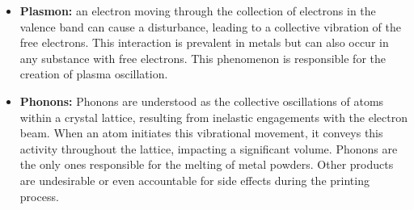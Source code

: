 \begin{itemize}
    \item \textbf{Plasmon:} an electron moving through the collection of electrons in the valence band can cause a disturbance, leading to a collective vibration of the free electrons. This interaction is prevalent in metals but can also occur in any substance with free electrons. This phenomenon is responsible for the creation of plasma oscillation.
    \item \textbf{Phonons:} Phonons are understood as the collective oscillations of atoms within a crystal lattice, resulting from inelastic engagements with the electron beam. When an atom initiates this vibrational movement, it conveys this activity throughout the lattice, impacting a significant volume. Phonons are the only ones responsible for the melting of metal powders. Other products are undesirable or even accountable for side effects during the printing process.
\end{itemize}
